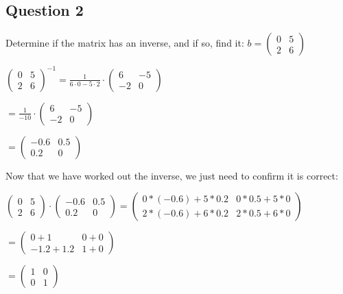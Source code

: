 \documentclass[options]{article}
\begin{document}
\subsection{Question 2}
Determine if the matrix has an inverse, and if so, find it: \( b = \begin{pmatrix} 0 & 5\\2 & 6 \end{pmatrix} \)
\begin{center}
    \( 
        \begin{pmatrix} 
            0 & 5\\2 & 6 
        \end{pmatrix}^{-1} 
        = \frac{1}{6 
            \cdot 0 - 5 
            \cdot 2} 
            \cdot 
        \begin{pmatrix}
            6 & -5\\-2 & 0
        \end{pmatrix}
    \)

    \(
        = 
        \frac{1}{-10}
        \cdot
        \begin{pmatrix}
            6 & -5\\
            -2 & 0
        \end{pmatrix}
    \)
    
    \(
        = \begin{pmatrix}
            -0.6 & 0.5\\
            0.2 & 0
        \end{pmatrix}
    \)
\end{center}
Now that we have worked out the inverse, we just need to confirm it is correct:
\begin{center}
    \(
        \begin{pmatrix}
            0 & 5\\
            2 & 6
        \end{pmatrix}
        \cdot
        \begin{pmatrix}
            -0.6 & 0.5\\
            0.2 & 0
        \end{pmatrix}
        =
        \begin{pmatrix}
            0 * (-0.6) + 5 * 0.2 & 0 * 0.5 + 5 * 0\\
            2 * (-0.6) + 6 * 0.2 & 2 * 0.5 + 6 * 0
        \end{pmatrix}
    \)

    \(
        = 
        \begin{pmatrix}
            0 + 1 & 0 + 0\\
            -1.2 + 1.2 & 1 + 0
        \end{pmatrix}
    \)

    \(
        =
        \begin{pmatrix}
            1 & 0\\
            0 & 1
        \end{pmatrix}
    \)
\end{center}
\end{document}
